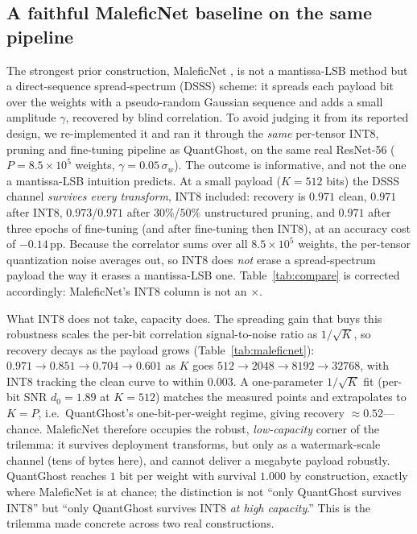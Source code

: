 \documentclass[a4paper,fleqn]{cas-dc}
\theoremstyle{plain}
\theoremstyle{remark}
\newcommand{\sys}{\mbox{QuantGhost}}
\begin{document}
\subsection{A faithful MaleficNet baseline on the same pipeline}\label{sec:maleficnet}
The strongest prior construction, MaleficNet \cite{hitaj2022maleficnet}, is not a
mantissa-LSB method but a direct-sequence spread-spectrum (DSSS) scheme: it spreads each
payload bit over the weights with a pseudo-random Gaussian sequence and adds a small
amplitude $\gamma$, recovered by blind correlation. To avoid judging it from its reported
design, we re-implemented it and ran it through the \emph{same} per-tensor INT8, pruning and
fine-tuning pipeline as \sys, on the same real ResNet-56 ($P=8.5\times10^{5}$ weights,
$\gamma=0.05\,\sigma_w$). The outcome is informative, and not the one a mantissa-LSB intuition
predicts. At a small payload ($K=512$ bits) the DSSS channel \emph{survives every transform},
INT8 included: recovery is $0.971$ clean, $0.971$ after INT8, $0.973$/$0.971$ after $30\%$/$50\%$
unstructured pruning, and $0.971$ after three epochs of fine-tuning (and after fine-tuning
then INT8), at an accuracy cost of $-0.14$\,pp. Because the correlator sums over all
$8.5\times10^{5}$ weights, the per-tensor quantization noise averages out, so INT8 does
\emph{not} erase a spread-spectrum payload the way it erases a mantissa-LSB one. Table~\ref{tab:compare}
is corrected accordingly: MaleficNet's INT8 column is not an $\times$.

What INT8 does not take, capacity does. The spreading gain that buys this robustness scales
the per-bit correlation signal-to-noise ratio as $1/\sqrt{K}$, so recovery decays as the
payload grows (Table~\ref{tab:maleficnet}): $0.971\to0.851\to0.704\to0.601$ as $K$ goes
$512\to2048\to8192\to32768$, with INT8 tracking the clean curve to within $0.003$. A
one-parameter $1/\sqrt{K}$ fit (per-bit SNR $d_0{=}1.89$ at $K{=}512$) matches the measured
points and extrapolates to $K=P$, i.e.\ \sys's one-bit-per-weight regime, giving recovery
$\approx0.52$---chance. MaleficNet therefore occupies the robust, \emph{low-capacity} corner of
the trilemma: it survives deployment transforms, but only as a watermark-scale channel (tens of
bytes here), and cannot deliver a megabyte payload robustly. \sys{} reaches $1$ bit per weight
with survival $1.000$ by construction, exactly where MaleficNet is at chance; the distinction is
not ``only \sys{} survives INT8'' but ``only \sys{} survives INT8 \emph{at high capacity}.''
This is the trilemma made concrete across two real constructions.
\end{document}
